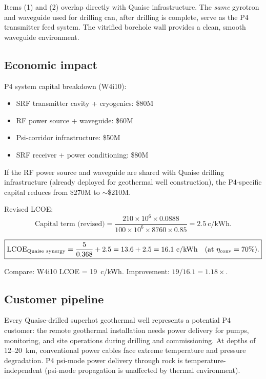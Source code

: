 \documentclass[11pt]{article}
\newcommand{\ee}[1]{\times 10^{#1}}
\begin{document}
Items (1) and (2) overlap directly with Quaise infrastructure. The
\emph{same} gyrotron and waveguide used for drilling can, after drilling
is complete, serve as the P4 transmitter feed system. The vitrified borehole
wall provides a clean, smooth waveguide environment.

\subsection{Economic impact}

P4 system capital breakdown (W4i10):
\begin{itemize}[nosep]
\item SRF transmitter cavity + cryogenics: \$80M
\item RF power source + waveguide: \$60M
\item Psi-corridor infrastructure: \$50M
\item SRF receiver + power conditioning: \$80M
\end{itemize}

If the RF power source and waveguide are shared with Quaise drilling
infrastructure (already deployed for geothermal well construction), the
P4-specific capital reduces from \$270M to $\sim$\$210M.

Revised LCOE:
\begin{equation}
\text{Capital term (revised)} = \frac{210\ee{6} \times 0.0888}
{100\ee{6} \times 8760 \times 0.85} = 2.5~\text{c/kWh}.
\end{equation}

\begin{equation}
\boxed{\text{LCOE}_{\rm Quaise~synergy} = \frac{5}{0.368} + 2.5
= 13.6 + 2.5 = 16.1~\text{c/kWh}
\quad\text{(at $\eta_{\rm conv} = 70\%$)}.}
\end{equation}

Compare: W4i10 LCOE = 19~c/kWh. Improvement: $19/16.1 = 1.18\times$.

\subsection{Customer pipeline}

Every Quaise-drilled superhot geothermal well represents a potential P4
customer: the remote geothermal installation needs power delivery for pumps,
monitoring, and site operations during drilling and commissioning. At depths
of 12--20~km, conventional power cables face extreme temperature and pressure
degradation. P4 psi-mode power delivery through rock is temperature-independent
(psi-mode propagation is unaffected by thermal environment).
\end{document}
